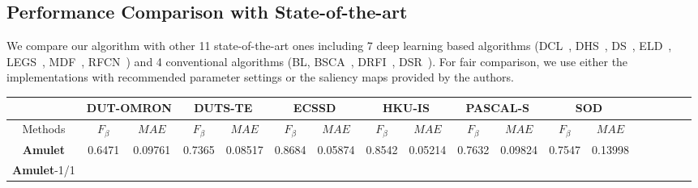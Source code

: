 \documentclass[10pt,twocolumn,letterpaper]{article}
\begin{document}
\subsection{Performance Comparison with State-of-the-art}
We compare our algorithm with other 11 state-of-the-art ones including 7 deep learning based algorithms (DCL~\cite{LiYu16}, DHS~\cite{liu2016dhsnet}, DS~\cite{Li2016DeepSaliency}, ELD~\cite{lee2016deep}, LEGS~\cite{wang2015deep}, MDF~\cite{zhao2015saliency}, RFCN~\cite{wang2016saliency})
and 4 conventional algorithms (BL\cite{tong2015bootstrap}, BSCA~\cite{qin2015saliency}, DRFI~\cite{jiang2013salient}, DSR~\cite{li2013saliency}).
For fair comparison, we use either the implementations with recommended parameter settings or the saliency maps provided by the authors.
\setlength{\tabcolsep}{2.95pt}
\begin{table*}
\vspace{-5mm}
\begin{center}
\doublerulesep=0.6pt
\begin{tabular}{|c|c|c|c|c|c|c|c|c|c|c|c|c|c|c|c|c|c|c|c|c|c|c|c|c|||c|c|c|c|c|c|c|c|||}
\hline
\multicolumn{4}{|c|}{}
&\multicolumn{4}{|c|}{DUT-OMRON}
&\multicolumn{4}{|c|}{DUTS-TE}
&\multicolumn{4}{|c|}{ECSSD}
&\multicolumn{4}{|c|}{HKU-IS}
&\multicolumn{4}{|c|}{PASCAL-S}
&\multicolumn{4}{|c|}{SOD}
\\
\hline
\multicolumn{4}{|c|}{Methods}
&\multicolumn{2}{|c|}{$F_\beta$}&\multicolumn{2}{|c|}{$MAE$}&\multicolumn{2}{|c|}{$F_\beta$}&\multicolumn{2}{|c|}{$MAE$}&\multicolumn{2}{|c|}{$F_\beta$}&\multicolumn{2}{|c|}{$MAE$}&\multicolumn{2}{|c|}{$F_\beta$}&\multicolumn{2}{|c|}{$MAE$}&\multicolumn{2}{|c|}{$F_\beta$}&\multicolumn{2}{|c|}{$MAE$}&\multicolumn{2}{|c|}{$F_\beta$}&\multicolumn{2}{|c|}{$MAE$}\\
\hline
\multicolumn{4}{|c|}{\textbf{Amulet}}
&\multicolumn{2}{|c|}{\textcolor[rgb]{0,1,0}{0.6471}}&\multicolumn{2}{|c|}{\textcolor[rgb]{0,0,1}{0.09761}}&\multicolumn{2}{|c|}{\textcolor[rgb]{1,0,0}{0.7365}}&\multicolumn{2}{|c|}{\textcolor[rgb]{0,1,0}{0.08517}}&\multicolumn{2}{|c|}{\textcolor[rgb]{1,0,0}{0.8684}}&\multicolumn{2}{|c|}{\textcolor[rgb]{1,0,0}{0.05874}}&\multicolumn{2}{|c|}{\textcolor[rgb]{1,0,0}{0.8542}}&\multicolumn{2}{|c|}{\textcolor[rgb]{1,0,0}{0.05214}}&\multicolumn{2}{|c|}{\textcolor[rgb]{0,0,1}{0.7632}}&\multicolumn{2}{|c|}{\textcolor[rgb]{0,1,0}{0.09824}}&\multicolumn{2}{|c|}{\textcolor[rgb]{0,1,0}{0.7547}}&\multicolumn{2}{|c|}{\textcolor[rgb]{0,1,0}{0.13998}}\\
\multicolumn{4}{|c|}{\textbf{Amulet}-1/1}

\end{tabular}
\end{center}
\end{table*}
\end{document}
